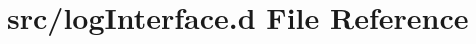 \hypertarget{log_interface_8d}{}\section{src/log\+Interface.d File Reference}
\label{log_interface_8d}
